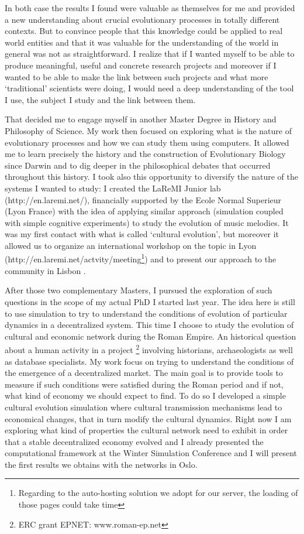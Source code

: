 \documentclass[10pt]{article}
\begin{document}
In both case the results I found were valuable as themselves for me and provided a new understanding about crucial evolutionary processes in totally different contexts. But to convince people that this knowledge could be applied to real world entities and that it was valuable for the understanding of the world in general was not as straightforward. I realize that if I wanted myself to be able to produce meaningful, useful and concrete research projects and moreover if I wanted to be able to make the link between such projects and what more ‘traditional’ scientists were doing, I would need a deep understanding of the tool I use, the subject I study and the link between them. 

That decided me to engage myself in another Master Degree in History and Philosophy of Science. My work then focused on exploring what is the nature of evolutionary processes and how we can study them using computers. It allowed me to learn precisely the history and the construction of Evolutionary Biology since Darwin and to dig deeper in the philosophical debates that occurred throughout this history. I took also this opportunity to diversify the nature of the systems I wanted to study: I created the LaReMI Junior lab (http://en.laremi.net/), financially supported by the Ecole Normal Superieur (Lyon France) with the idea of applying similar approach (simulation coupled with simple cognitive experiments) to study the evolution of music melodies. It was my first contact with what is called ‘cultural evolution’, but moreover it allowed us to organize an international workshop on the topic in Lyon (http://en.laremi.net/actvity/meeting\footnote{Regarding to the auto-hosting solution we adopt for our server, the loading of those pages could take time}) and to present our approach to the community in Lisbon \cite{carrignon2013whyapply}.

After those two complementary Masters, I pursued the exploration of such questions in the scope of my actual PhD I started last year. The idea here is still to use simulation to try to understand the conditions of evolution of particular dynamics in a decentralized system. This time I choose to study the evolution of cultural and economic network during the Roman Empire. An historical question about a human activity in a project \footnote{ERC grant EPNET: www.roman-ep.net} involving historians, archaeologists as well as database specialists. My work focus on trying to understand the conditions of the emergence of a decentralized market. The main goal is to provide tools to measure if such conditions were satisfied during the Roman period and if not, what kind of economy we should expect to find. To do so I developed a simple cultural evolution simulation where cultural transmission mechanisms lead to economical changes, that in turn modify the cultural dynamics. Right now I am exploring what kind of properties the cultural network need to exhibit in order that a stable decentralized economy evolved and I already presented the computational framework at the Winter Simulation Conference \cite{carrignon2015modelingthecoevolutionoftradeandcultureinpastsocieties} and I will present the first results we obtains with the networks in Oslo.
\end{document}
